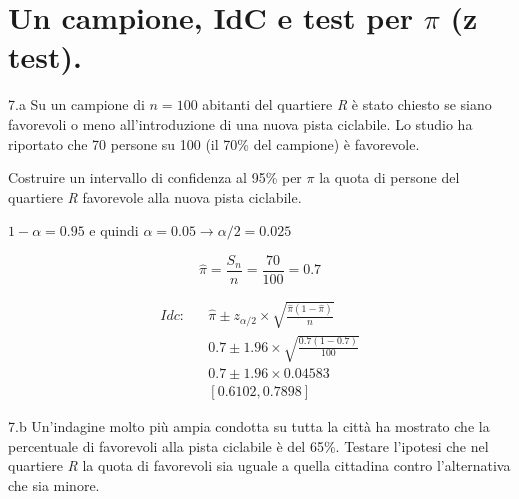 \documentclass[
  11pt,
]{book}
\theoremstyle{mytheoremstyle}
\theoremstyle{mydefstyle}
\newenvironment{sol}
  {
  \begin{tcolorbox}[enhanced,breakable,arc=0.1mm,boxrule=1pt,colback=white,colframe=iblue,
  title=\bf \fontfamily{lmss}\selectfont \hspace{.5 cm} Soluzione,drop fuzzy shadow]

}{
\end{tcolorbox}
  }
\begin{document}
\section{\texorpdfstring{Un campione, IdC e test per \(\pi\) (z test).}{Un campione, IdC e test per \textbackslash pi (z test).}}\label{un-campione-idc-e-test-per-pi-z-test.}

7.a Su un campione di \(n = 100\) abitanti del quartiere \emph{R} è stato chiesto se siano favorevoli o meno all'introduzione di una nuova pista ciclabile. Lo studio ha riportato che 70 persone su 100 (il 70\% del campione) è favorevole.

Costruire un intervallo di confidenza al 95\% per \(\pi\) la quota di persone del quartiere \emph{R} favorevole alla nuova pista ciclabile.

\begin{sol}
\(1-\alpha =0.95\) e quindi \(\alpha=0.05\rightarrow \alpha/2=0.025\)

\[
  \hat\pi = \frac{S_n}n = \frac{ 70 }{ 100 }= 0.7 
\]

\begin{eqnarray*}
  Idc: & &  \hat\pi \pm  z_{\alpha/2} \times \sqrt{\frac{\hat\pi(1-\hat\pi)}{n}} \\
     & &  0.7 \pm  1.96 \times \sqrt{\frac{ 0.7 (1- 0.7 )}{ 100 }} \\
     & &  0.7 \pm  1.96 \times  0.04583 \\
     & & [ 0.6102 ,  0.7898 ]
\end{eqnarray*}

\end{sol}

7.b Un'indagine molto più ampia condotta su tutta la città ha mostrato che
la percentuale di favorevoli alla pista ciclabile è del 65\%. Testare l'ipotesi che nel quartiere \emph{R} la quota di favorevoli sia uguale a quella cittadina contro l'alternativa che sia minore.
\end{document}
